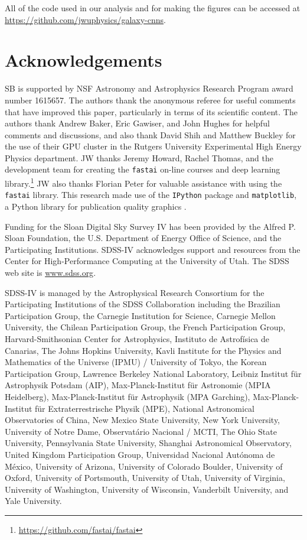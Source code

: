 \documentclass[fleqn,usenatbib]{mnras}
\begin{document}
All of the code used in our analysis and for making the figures can be accessed at \url{https://github.com/jwuphysics/galaxy-cnns}. 

\section*{Acknowledgements}

SB is supported by NSF Astronomy and Astrophysics Research Program award number 1615657.
The authors thank the anonymous referee for useful comments that have improved this paper, particularly in terms of its scientific content.
The authors thank Andrew Baker, Eric Gawiser, and John Hughes for helpful comments and discussions, and also thank David Shih and Matthew Buckley for the use of their GPU cluster in the Rutgers University Experimental High Energy Physics department. 
JW thanks Jeremy Howard, Rachel Thomas, and the development team for creating the \texttt{fastai} on-line courses and deep learning library.\footnote{\url{https://github.com/fastai/fastai}}
JW also thanks Florian Peter for valuable assistance with using the \texttt{fastai} library.
This research made use of the {\tt IPython} package \citep{Perez2007} and {\tt matplotlib}, a Python library for publication quality graphics \citep{Hunter2007}.

Funding for the Sloan Digital Sky Survey IV has been provided by the Alfred P. Sloan Foundation, the U.S. Department of Energy Office of Science, and the Participating Institutions. SDSS-IV acknowledges
support and resources from the Center for High-Performance Computing at
the University of Utah. The SDSS web site is \url{www.sdss.org}.

SDSS-IV is managed by the Astrophysical Research Consortium for the
Participating Institutions of the SDSS Collaboration including the
Brazilian Participation Group, the Carnegie Institution for Science,
Carnegie Mellon University, the Chilean Participation Group, the French Participation Group, Harvard-Smithsonian Center for Astrophysics,
Instituto de Astrof\'isica de Canarias, The Johns Hopkins University,
Kavli Institute for the Physics and Mathematics of the Universe (IPMU) /
University of Tokyo, the Korean Participation Group, Lawrence Berkeley National Laboratory,
Leibniz Institut f\"ur Astrophysik Potsdam (AIP),
Max-Planck-Institut f\"ur Astronomie (MPIA Heidelberg),
Max-Planck-Institut f\"ur Astrophysik (MPA Garching),
Max-Planck-Institut f\"ur Extraterrestrische Physik (MPE),
National Astronomical Observatories of China, New Mexico State University,
New York University, University of Notre Dame,
Observat\'ario Nacional / MCTI, The Ohio State University,
Pennsylvania State University, Shanghai Astronomical Observatory,
United Kingdom Participation Group,
Universidad Nacional Aut\'onoma de M\'exico, University of Arizona,
University of Colorado Boulder, University of Oxford, University of Portsmouth,
University of Utah, University of Virginia, University of Washington, University of Wisconsin,
Vanderbilt University, and Yale University.
\end{document}
